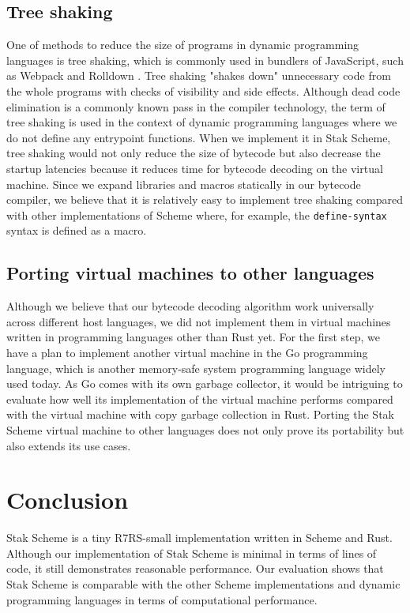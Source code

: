 \documentclass[sigplan, anonymous, review]{acmart}
\begin{document}
\subsection{Tree shaking}

One of methods to reduce the size of programs in dynamic programming
languages is tree shaking\cite{treeshaking}, which is commonly used
in bundlers of JavaScript, such as Webpack \cite{webpack} and Rolldown
\cite{rolldown}.
Tree shaking "shakes down" unnecessary code from
the whole programs with checks of visibility and side effects.
Although dead code elimination is a commonly known pass in the
compiler technology, the term of tree shaking is used
in the context of dynamic programming languages where we do not define
any entrypoint functions.
When we implement it in Stak Scheme, tree shaking would not only
reduce the size of bytecode but also decrease the startup latencies
because it reduces time for bytecode decoding on the virtual machine.
Since we expand libraries and macros statically
in our bytecode compiler, we believe that it is relatively easy to
implement tree shaking compared with other implementations of Scheme
where, for example, the \texttt{define-syntax} syntax is defined as a macro.

\subsection{Porting virtual machines to other languages} \label{portvm}

Although we believe that our bytecode decoding algorithm work
universally across different host languages, we did not implement them in
virtual machines written in programming languages other than Rust yet.
For the first step, we have a plan to implement another virtual
machine in the Go programming language, which is another memory-safe system
programming language widely used today.
As Go comes with its own garbage collector,
it would be intriguing to evaluate how well its implementation of the
virtual machine performs compared with the virtual
machine with copy garbage collection in Rust.
Porting the Stak Scheme virtual machine to other languages does
not only prove its portability but also extends its use cases.

\section{Conclusion}

Stak Scheme is a tiny R7RS-small implementation written in Scheme and
Rust.
Although our implementation of Stak Scheme is minimal in terms of
lines of code, it still demonstrates reasonable performance.
Our evaluation shows that Stak Scheme is
comparable with the other Scheme implementations and dynamic
programming languages in terms of computational performance.
\end{document}

